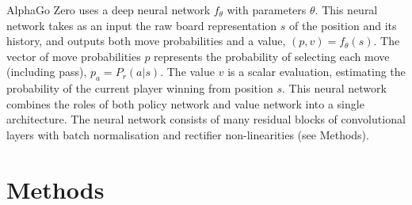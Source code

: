 \documentclass[12pt,a4paper]{article}
\begin{document}
AlphaGo Zero uses a deep neural network \(f_\theta\) with parameters \(\theta\). This neural network takes as an input the raw board representation \(s\) of the position and its history, and outputs both move probabilities and a value, \((p, v) = f_\theta(s)\). The vector of move probabilities \(p\) represents the probability of selecting each move (including pass), \(p_a = P_r(a|s)\). The value \(v\) is a scalar evaluation, estimating the probability of the current player winning from position \(s\). This neural network combines the roles of both policy network and value network\cite{AlphaGo} into a single architecture. The neural network consists of many residual blocks\cite{ResNet} of convolutional layers\cite{CNNpaper} with batch normalisation\cite{BN} and rectifier non-linearities\cite{ReLU} (see Methods).\par
\clearpage
\section{Methods}
\end{document}
